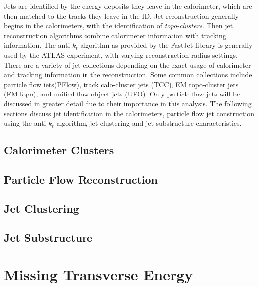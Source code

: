 Jets are identified by the energy deposits they leave in the calorimeter, which are then matched to the tracks they leave in the ID. Jet reconstruction generally begins in the calorimeters, with the identification of \textit{topo-clusters}. Then jet reconstruction algorithms combine calorimeter information with tracking information. The anti-$k_t$ algorithm \cite{anti_kt} as provided by the FastJet library \cite{fast_jet} is generally used by the ATLAS experiment, with varying reconstruction radius settings. There are a variety of jet collections depending on the exact usage of calorimeter and tracking information in the reconstruction. Some common collections include particle flow iets(PFlow), track calo-cluster jets (TCC), EM topo-cluster jets (EMTopo), and unified flow object jets (UFO). Only particle flow jets will be discussed in greater detail due to their importance in this analysis. The following sections discuss jet identification in the calorimeters, particle flow jet construction using the anti-$k_t$ algorithm, jet clustering and jet substructure characteristics.

\subsection{Calorimeter Clusters}
\subsection{Particle Flow Reconstruction}
\subsection{Jet Clustering}
\subsection{Jet Substructure}

\section{Missing Transverse Energy}
